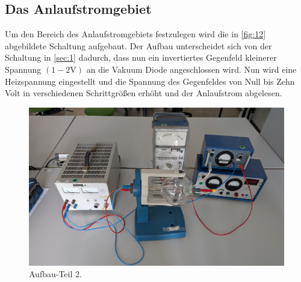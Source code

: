 \subsection{Das Anlaufstromgebiet}
Um den Bereich des Anlaufstromgebiets festzulegen wird die in \autoref{fig:12}
abgebildete Schaltung aufgebaut. Der Aufbau unterscheidet sich von der Schaltung
in \autoref{sec:1} dadurch, dass nun ein invertiertes Gegenfeld kleinerer Spannung
$\left(1 - 2\unit{\volt}\right)$ an die Vakuum Diode angeschlossen wird.
Nun wird eine Heizspannung eingestellt und die Spannung des Gegenfeldes
von Null bis Zehn Volt in verschiedenen Schrittgrößen erhöht und der Anlaufstrom
abgelesen.
\begin{figure}[H]
    \centering
        \centering
        \includegraphics[width=\textwidth]{Bilder/1.jpg}
        \caption{Aufbau-Teil 2.}
    \hfill
    \label{fig:12}
\end{figure}